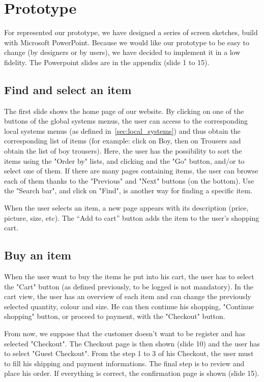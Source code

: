 \section{Prototype}

For represented our prototype, we have designed a series of screen sketches, build with Microsoft PowerPoint. Because we would like our prototype to be easy to change (by designers or by users),
we have decided to implement it in a low fidelity. The Powerpoint slides are in the appendix (slide 1 to 15).

\subsection{Find and select an item}
The first slide shows the home page of our website. By clicking on one of the buttons of the global systems menus, the user can access to the corresponding local systems menus (as defined in~\ref{sec:local_systems}) and thus obtain the corresponding list of items (for example: click on Boy, then on Trousers and obtain the list of boy trousers). Here, the user has the possibility to sort the items using the "Order by" lists, and clicking and the "Go" button, and/or to select one of them. If there are many pages containing items, the user can browse each of them thanks to the "Previous" and "Next" buttons (on the bottom). Use the "Search bar", and click on "Find", is another way for finding a specific item.

When the user selects an item, a new page appears with its description (price, picture, size, etc). 
The ``Add to cart'' button adds the item to the user's shopping cart.

\subsection{Buy an item}
When the user want to buy the items he put into his cart, the user has to select the "Cart" button (as defined previously, to be logged is not mandatory). In the cart view, the user has an overview of each item and can change the previously selected quantity, colour and size. He can then continue his shopping, "Continue shopping" button, or proceed to payment, with the "Checkout" button.

From now, we suppose that the customer doesn't want to be register and has selected "Checkout". The Checkout page is then shown (slide 10) and the user has to select "Guest Checkout". From the step 1 to 3 of his Checkout, the user must to fill his shipping and payment informations. The final step is to review and place his order. If everything is correct, the confirmation page is shown (slide 15).
